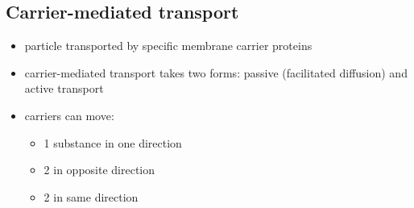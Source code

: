 \documentclass[10pt]{article}
\begin{document}
\subsection{Carrier-mediated transport}
\begin{itemize}
    \item particle transported by specific membrane carrier proteins
    \item carrier-mediated transport takes two forms: passive (facilitated diffusion) and active transport
    \item carriers can move:
        \begin{itemize}
            \item 1 substance in one direction
            \item 2 in opposite direction
            \item 2 in same direction
        \end{itemize}
\end{itemize}
\end{document}
